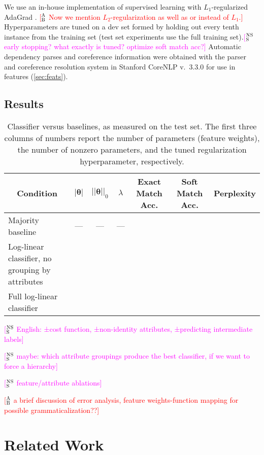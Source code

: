 \documentclass[11pt,letterpaper]{article}
\newcommand{\ensuretext}[1]{#1}
\newcommand{\nssmarker}{\ensuretext{\textcolor{magenta}{\ensuremath{^{\textsc{NS}}_{\textsc{S}}}}}}
\newcommand{\abmarker}{\ensuretext{\textcolor{red}{\ensuremath{^{\textsc{A}}_{\textsc{B}}}}}}
\newcommand{\arkcomment}[3]{\ensuretext{\textcolor{#3}{[#1 #2]}}}
\newcommand{\nss}[1]{\arkcomment{\nssmarker}{#1}{magenta}}
\newcommand{\ab}[1]{\arkcomment{\abmarker}{#1}{red}}
\begin{document}
We use an in-house implementation of supervised learning with $L_1$-regularized AdaGrad \citep{adagrad}. \ab{Now we mention $L_2$-regularization as well as or instead of $L_1$.}
Hyperparameters are tuned on a dev set formed by holding out every tenth instance from the training set 
(test set experiments use the full training set).\nss{early stopping? what exactly is tuned? optimize soft match acc?} 
Automatic dependency parses and coreference information were obtained with 
the parser and coreference resolution system in Stanford CoreNLP v.~3.3.0 \citep{socher-13,recasens-13}
for use in features (\cref{sec:feats}).

\subsection{Results}

\begin{table*}\small\centering
\begin{tabular}{@{}lrrrrrr@{}}
\multicolumn{1}{c}{\bf Condition} & \multicolumn{1}{c}{$|\boldsymbol{\theta}|$} & \multicolumn{1}{c}{$||\boldsymbol{\theta}||_0$} & \multicolumn{1}{c}{$\lambda$} 
& \multicolumn{1}{c}{\bf Exact Match Acc.} & \multicolumn{1}{c}{\bf Soft Match Acc.} 
& \multicolumn{1}{c}{\bf Perplexity} \\
\midrule
Majority baseline & \multicolumn{1}{c}{---} & \multicolumn{1}{c}{---} & \multicolumn{1}{c}{---} & \\
Log-linear classifier, no grouping by attributes & & \\
Full log-linear classifier & & \\
\end{tabular}
\caption{Classifier versus baselines, as measured on the test set. 
The first three columns of numbers report the number of parameters (feature weights), the number of nonzero parameters, 
and the tuned regularization hyperparameter, respectively.}
\label{tbl:results}
\end{table*}

\nss{English: ±cost function, ±non-identity attributes, ±predicting intermediate labels}

\nss{maybe: which attribute groupings produce the best classifier, if we want to force a hierarchy}

\nss{feature/attribute ablations}

\ab{a brief discussion of error analysis, feature weights-function mapping for possible grammaticalization??}


\section{Related Work}\label{sec:related}
\end{document}
